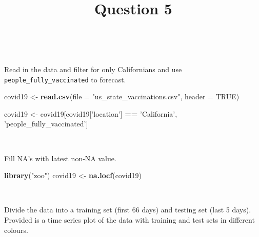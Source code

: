 \documentclass[]{article}
\title{Question 5}
\author{}
\date{}
\newenvironment{Shaded}{\begin{snugshade}}{\end{snugshade}}
\newcommand{\DataTypeTok}[1]{\textcolor[rgb]{0.13,0.29,0.53}{#1}}
\newcommand{\KeywordTok}[1]{\textcolor[rgb]{0.13,0.29,0.53}{\textbf{#1}}}
\newcommand{\NormalTok}[1]{#1}
\newcommand{\OperatorTok}[1]{\textcolor[rgb]{0.81,0.36,0.00}{\textbf{#1}}}
\newcommand{\OtherTok}[1]{\textcolor[rgb]{0.56,0.35,0.01}{#1}}
\newcommand{\StringTok}[1]{\textcolor[rgb]{0.31,0.60,0.02}{#1}}
\begin{document}
\maketitle

\(\;\) \(\;\)

Read in the data and filter for only Californians and use
\texttt{people\_fully\_vaccinated} to forecast.

\begin{Shaded}
\begin{Highlighting}[]
\NormalTok{covid19 <-}\StringTok{ }\KeywordTok{read.csv}\NormalTok{(}\DataTypeTok{file =} \StringTok{"us_state_vaccinations.csv"}\NormalTok{, }\DataTypeTok{header =} \OtherTok{TRUE}\NormalTok{)}

\NormalTok{covid19 <-}\StringTok{ }\NormalTok{covid19[covid19[}\StringTok{'location'}\NormalTok{] }\OperatorTok{==}\StringTok{ 'California'}\NormalTok{, }\StringTok{'people_fully_vaccinated'}\NormalTok{]}
\end{Highlighting}
\end{Shaded}

\(\;\)

Fill NA's with latest non-NA value.

\begin{Shaded}
\begin{Highlighting}[]
\KeywordTok{library}\NormalTok{(}\StringTok{"zoo"}\NormalTok{)}
\NormalTok{covid19 <-}\StringTok{ }\KeywordTok{na.locf}\NormalTok{(covid19)}
\end{Highlighting}
\end{Shaded}

\(\;\)

Divide the data into a training set (first 66 days) and testing set
(last 5 days). Provided is a time series plot of the data with training
and test sets in different colours.
\end{document}
